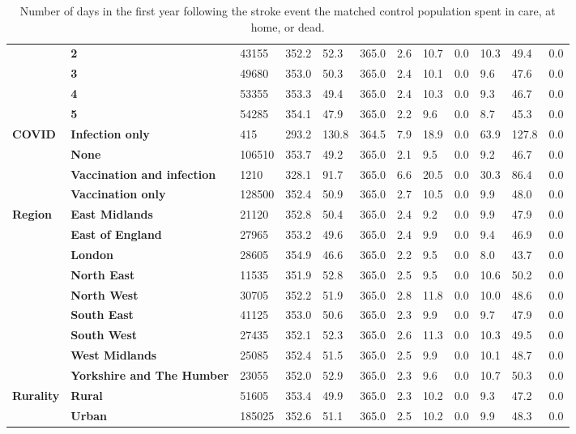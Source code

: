 \begin{landscape}
\begin{table}[!ht]
\begin{tabular}{|l|l|l|l|l|l|l|l|l|l|l|l|}
        & \bf 2 & 43155 & 352.2 & 52.3 & 365.0 & 2.6 & 10.7 & 0.0 & 10.3 & 49.4 & 0.0 \\
        & \bf 3 & 49680 & 353.0 & 50.3 & 365.0 & 2.4 & 10.1 & 0.0 & 9.6 & 47.6 & 0.0 \\
        & \bf 4 & 53355 & 353.3 & 49.4 & 365.0 & 2.4 & 10.3 & 0.0 & 9.3 & 46.7 & 0.0 \\
        & \bf 5 & 54285 & 354.1 & 47.9 & 365.0 & 2.2 & 9.6 & 0.0 & 8.7 & 45.3 & 0.0 \\ \hline
        \multirow{4}{*}{\bf COVID} & \bf Infection only & 415 & 293.2 & 130.8 & 364.5 & 7.9 & 18.9 & 0.0 & 63.9 & 127.8 & 0.0 \\
        & \bf None & 106510 & 353.7 & 49.2 & 365.0 & 2.1 & 9.5 & 0.0 & 9.2 & 46.7 & 0.0 \\
        & \bf Vaccination and infection & 1210 & 328.1 & 91.7 & 365.0 & 6.6 & 20.5 & 0.0 & 30.3 & 86.4 & 0.0 \\
        & \bf Vaccination only & 128500 & 352.4 & 50.9 & 365.0 & 2.7 & 10.5 & 0.0 & 9.9 & 48.0 & 0.0 \\ \hline
        \multirow{9}{*}{\bf Region} & \bf East Midlands & 21120 & 352.8 & 50.4 & 365.0 & 2.4 & 9.2 & 0.0 & 9.9 & 47.9 & 0.0 \\
        & \bf East of England & 27965 & 353.2 & 49.6 & 365.0 & 2.4 & 9.9 & 0.0 & 9.4 & 46.9 & 0.0 \\
        & \bf London & 28605 & 354.9 & 46.6 & 365.0 & 2.2 & 9.5 & 0.0 & 8.0 & 43.7 & 0.0 \\
        & \bf North East & 11535 & 351.9 & 52.8 & 365.0 & 2.5 & 9.5 & 0.0 & 10.6 & 50.2 & 0.0 \\
        & \bf North West & 30705 & 352.2 & 51.9 & 365.0 & 2.8 & 11.8 & 0.0 & 10.0 & 48.6 & 0.0 \\
        & \bf South East & 41125 & 353.0 & 50.6 & 365.0 & 2.3 & 9.9 & 0.0 & 9.7 & 47.9 & 0.0 \\
        & \bf South West & 27435 & 352.1 & 52.3 & 365.0 & 2.6 & 11.3 & 0.0 & 10.3 & 49.5 & 0.0 \\
        & \bf West Midlands & 25085 & 352.4 & 51.5 & 365.0 & 2.5 & 9.9 & 0.0 & 10.1 & 48.7 & 0.0 \\
        & \bf Yorkshire and The Humber & 23055 & 352.0 & 52.9 & 365.0 & 2.3 & 9.6 & 0.0 & 10.7 & 50.3 & 0.0 \\ \hline
        \multirow{2}{*}{\bf Rurality} & \bf Rural & 51605 & 353.4 & 49.9 & 365.0 & 2.3 & 10.2 & 0.0 & 9.3 & 47.2 & 0.0 \\
        & \bf Urban & 185025 & 352.6 & 51.1 & 365.0 & 2.5 & 10.2 & 0.0 & 9.9 & 48.3 & 0.0 \\ \hline
    \end{tabular}
    \caption{Number of days in the first year following the stroke event the matched control population spent in care, at home, or dead.}
    \label{tab:control_location_post_stroke}
\end{table}



\end{landscape}
